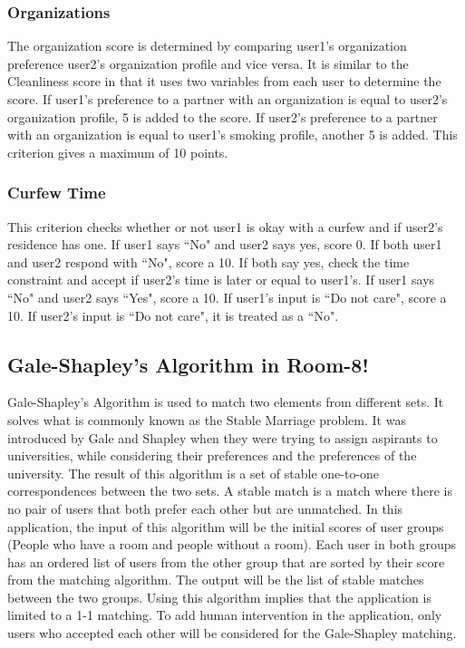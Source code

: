 \documentclass[journal]{./IEEE/IEEEtran}
\begin{document}
    \subsubsection{Organizations}
        The organization score is determined by comparing user1's organization preference user2's organization profile and vice versa.
        It is similar to the Cleanliness score in that it uses two variables from each user to determine the score.
        If user1's preference to a partner with an organization is equal to user2's organization profile, 5 is added to the score. If
        user2's preference to a partner with an organization is equal to user1's smoking profile, another 5 is added. This criterion gives a
        maximum of 10 points.

    \subsubsection{Curfew Time}
        This criterion checks whether or not user1 is okay with a curfew and if user2's residence has one. If user1 says
        ``No" and user2 says yes, score 0. If both user1 and user2 respond with ``No", score a 10. If both say yes,
        check the time constraint and accept if user2's time is later or equal to user1's. If user1 says ``No" and user2
        says ``Yes", score a 10. If user1's input is ``Do not care", score a 10. If user2's input is ``Do not care",
        it is treated as a ``No".

\subsection{Gale-Shapley's Algorithm in Room-8!}
Gale-Shapley's Algorithm is used to match two elements from different sets. It solves what is commonly known as the
Stable Marriage problem. It was introduced by Gale and Shapley when they were trying to assign aspirants to
universities, while considering their preferences and the preferences of the university\cite{irving}. The result of this
algorithm is a set of stable one-to-one correspondences between the two sets. A stable match is a match where there is
no pair of users that both prefer each other but are unmatched\cite{marriage}. In this application, the input of this
algorithm will be the initial scores of user groups (People who have a room and people without a room). Each user in
both groups has an ordered list of users from the other group that are sorted by their score from the matching
algorithm. The output will be the list of stable matches between the two groups. Using this algorithm implies that the
application is limited to a 1-1 matching. To add human intervention in the application, only users who accepted each
other will be considered for the Gale-Shapley matching.
\end{document}
